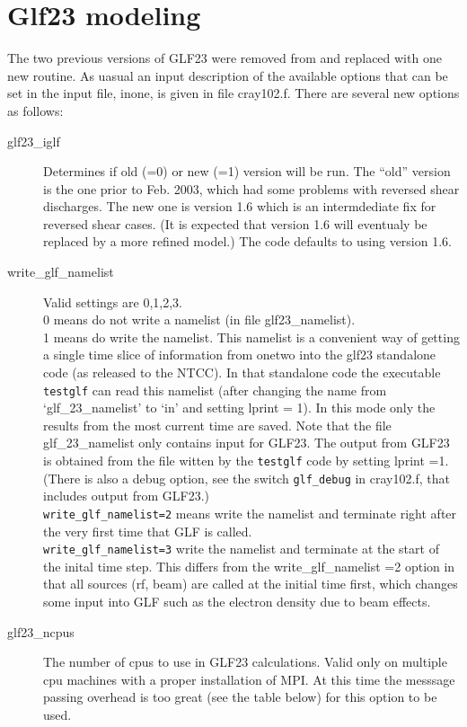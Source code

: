 \section{Glf23 modeling}
The two previous versions of GLF23  were removed from \ot and replaced with one
new routine. As uasual an input description of the available options that can be
set in the \ot input file, inone,  is given in file cray102.f. There are
several new options as follows:
\begin{description}
 \item[glf23\_iglf] Determines if old (=0) or new (=1) version will be run. The
 ``old'' version is the one prior to Feb. 2003, which had some problems with
 reversed shear discharges. The new one is version 1.6 which is an intermdediate
 fix for reversed shear cases. (It is expected that version 1.6 will eventualy
 be replaced by a more refined model.) The code defaults to using version 1.6. 
 \item[write\_glf\_namelist] Valid settings are 0,1,2,3.\\
 0 means do not  write a namelist (in file glf23\_namelist).\\
 1 means do write the namelist. This namelist is a convenient way of getting a
 single time slice of information from onetwo into the glf23 standalone code (as
 released to the NTCC). In that standalone code the executable \texttt{testglf}
 can read this namelist (after changing the name from `glf\_23\_namelist' to
 `in'  and setting lprint = 1). In this mode only the results from  the most
 current time are saved. Note  that the file glf\_23\_namelist only contains
 input for GLF23. The output from GLF23 is obtained from the file witten by the
 \texttt{testglf} code by setting lprint =1. (There is also a debug option, see
 the switch \texttt{glf\_debug} in cray102.f, that includes output from
 GLF23.)\\
 \texttt{write\_glf\_namelist=2}  means write the namelist and terminate \ot
 right after the very first time that GLF is called.\\
 \texttt{write\_glf\_namelist=3}  write the namelist and terminate \ot at the
 start of the inital time step. This differs from the  write\_glf\_namelist =2 
 option in that all sources (rf, beam) are called at the initial time first,
 which changes some input into GLF such as the electron density due to beam
 effects.
 \item[glf23\_ncpus]  The  number of cpus to use in GLF23 calculations. Valid
 only on multiple cpu machines with a proper installation of MPI. At this time
 the messsage passing overhead is too great (see the table below) for this
 option to be  used.
\end{description}

